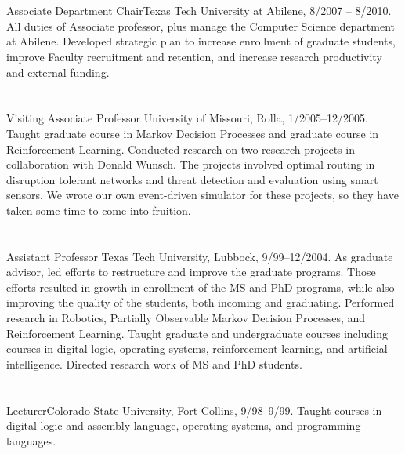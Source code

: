 \documentclass[12pt]{resume}
\begin{document}
\section{}
{Associate Department Chair}{Texas Tech University at Abilene, 8/2007 --
8/2010.  All duties of Associate professor, plus manage the Computer
Science department at Abilene.
Developed strategic plan to increase enrollment of graduate students,
improve Faculty recruitment and retention, and increase research productivity
and external funding.}

\section{}
{Visiting Associate Professor} {University of Missouri, Rolla,
1/2005--12/2005. Taught graduate course in Markov Decision Processes and
graduate course in Reinforcement Learning.  Conducted research on two
research projects in collaboration with Donald Wunsch.  The projects
involved optimal routing in disruption tolerant networks and threat detection
and evaluation using smart sensors.  We wrote our own event-driven simulator
for these projects, so they have taken some time to come into fruition. }

\section{}
{Assistant Professor} {Texas Tech University, Lubbock,
9/99--12/2004.  As graduate advisor, led efforts to restructure and improve
the graduate programs.  Those efforts resulted in growth in enrollment of
the MS and PhD programs, while also improving the quality of the students,
both incoming and graduating.  Performed research in Robotics, Partially
Observable Markov Decision Processes, and Reinforcement Learning.  Taught
graduate and undergraduate courses including courses in digital logic,
operating systems, reinforcement learning, and artificial intelligence.
Directed research work of MS and PhD students.}

\section{}
{Lecturer}{Colorado State University,
  Fort Collins, 9/98--9/99. Taught courses in digital
  logic and assembly language, operating systems, and programming
  languages.}
\end{document}
